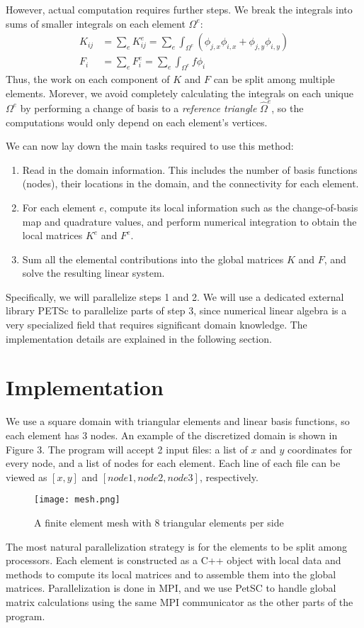 \documentclass[12pt,notitlepage]{extreport}
\begin{document}
However, actual computation requires further steps. We break the integrals into sums of smaller integrals on each element $\Omega^e$:
\begin{align}
  K_{ij} &= \sum_e K^e_{ij} = \sum_e \int_{\Omega^e} (\phi_{j,x} \phi_{i,x} + \phi_{j,y} \phi_{i,y}) \\
  F_i &= \sum_e F^e_i = \sum_e \int_{\Omega^e} f \phi_i
\end{align}
Thus, the work on each component of $K$ and $F$ can be split among multiple elements. Morever, we avoid completely calculating the integrals on each unique $\Omega^e$ by performing a change of basis to a \textit{reference triangle} $\hat{\Omega}^e$, so the computations would only depend on each element's vertices.

We can now lay down the main tasks required to use this method:
\begin{enumerate}
\item Read in the domain information. This includes the number of basis functions (nodes), their locations in the domain, and the connectivity for each element.
\item For each element $e$, compute its local information such as the change-of-basis map and quadrature values, and perform numerical integration to obtain the local matrices $K^e$ and $F^e$.
\item Sum all the elemental contributions into the global matrices $K$ and $F$, and solve the resulting linear system.
\end{enumerate}
Specifically, we will parallelize steps 1 and 2. We will use a dedicated external library PETSc to parallelize parts of step 3, since numerical linear algebra is a very specialized field that requires significant domain knowledge. The implementation details are explained in the following section.

\section*{Implementation}
We use a square domain with triangular elements and linear basis functions, so each element has 3 nodes. An example of the discretized domain is shown in Figure 3. The program will accept 2 input files: a list of $x$ and $y$ coordinates for every node, and a list of nodes for each element. Each line of each file can be viewed as $[x, y]$ and $[node1, node2, node3]$, respectively.

\begin{figure}[h]
  \centering
  \texttt{[image: mesh.png]}
  \caption{A finite element mesh with 8 triangular elements per side}
  \label{fig:mesh}
\end{figure}
The most natural parallelization strategy is for the elements to be split among processors. Each element is constructed as a C++ object with local data and methods to compute its local matrices and to assemble them into the global matrices. Parallelization is done in MPI, and we use PetSC to handle global matrix calculations using the same MPI communicator as the other parts of the program.
\end{document}
